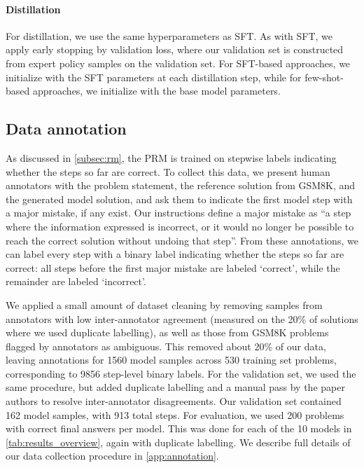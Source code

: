 \documentclass[11pt, a4paper, logo]{deepmind}
\newcommand{\PRM}{PRM}
\begin{document}
\paragraph{Distillation}
For distillation, we use the same hyperparameters as SFT. As with SFT, we apply early stopping by validation loss, where our validation set is constructed from expert policy samples on the validation set.
For SFT-based approaches, we initialize with the SFT parameters at each distillation step, while for few-shot-based approaches, we initialize with the base model parameters.


\subsection{Data annotation}
\label{subsec:annotation}
As discussed in \cref{subsec:rm}, the \PRM{} is trained on stepwise labels indicating whether the steps so far are correct.
To collect this data, we present human annotators with the problem statement, the reference solution from GSM8K, and the generated model solution, and ask them to indicate the first model step with a major mistake, if any exist.
Our instructions define a major mistake as ``a step where the information expressed is incorrect, or it would no longer be possible to reach the correct solution without undoing that step''.
From these annotations, we can label every step with a binary label indicating whether the steps so far are correct: all steps before the first major mistake are labeled `correct', while the remainder are labeled `incorrect'.



We applied a small amount of dataset cleaning by removing samples from annotators with low inter-annotator agreement (measured on the 20\% of solutions where we used duplicate labelling), as well as those from GSM8K problems flagged by annotators as ambiguous.
This removed about 20\% of our data, leaving annotations for 1560 model samples across 530 training set problems, corresponding to 9856 step-level binary labels.
For the validation set, we used the same procedure, but added duplicate labelling and a manual pass by the paper authors to resolve inter-annotator disagreements.
Our validation set contained 162 model samples, with 913 total steps.
For evaluation, we used 200 problems with correct final answers per model. This was done for each of the 10 models in \cref{tab:results_overview}, again with duplicate labelling.
We describe full details of our data collection procedure in \cref{app:annotation}.
\end{document}
